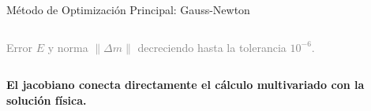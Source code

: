 \begin{frame}{Método de Optimización Principal: Gauss-Newton}
\begin{columns}[T]
        \vspace{0.1cm}
        \begin{center}
            \tiny \textcolor{gray}{
                Error $E$ y norma $\|\Delta m\|$ decreciendo hasta la tolerancia $10^{-6}$.
            }
        \end{center}

    \end{columns}

    \vspace{0.1cm}
    \begin{center}
        \footnotesize
        \textbf{El jacobiano conecta directamente el cálculo multivariado con la solución física.}
    \end{center}

\end{frame}
